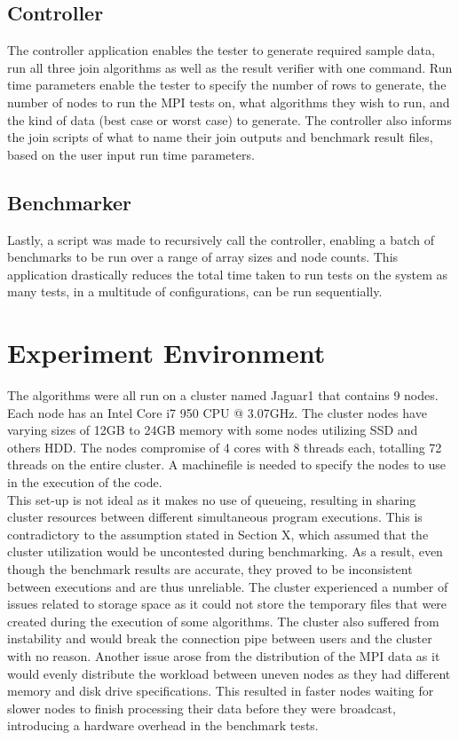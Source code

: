 \documentclass[10.5 pt, conference]{IEEEtran}
\begin{document}
\subsection{Controller}
The controller application enables the tester to generate required sample data, run all three join algorithms as well as the result verifier with one command. Run time parameters enable the tester to specify the number of rows to generate, the number of nodes to run the MPI tests on, what algorithms they wish to run, and the kind of data (best case or worst case) to generate. The controller also informs the join scripts of what to name their join outputs and benchmark result files, based on the user input run time parameters.

\subsection{Benchmarker}
Lastly, a script was made to recursively call the controller, enabling a batch of benchmarks to be run over a range of array sizes and node counts. This application drastically reduces the total time taken to run tests on the system as many tests, in a multitude of configurations, can be run sequentially. 

\section{Experiment Environment}
The algorithms were all run on a cluster named Jaguar1 that contains \num{9} nodes. Each node has an Intel Core i7 950 CPU @ 3.07GHz. The cluster nodes have varying sizes of 12GB to 24GB memory with some nodes utilizing SSD and others HDD. The nodes compromise of 4 cores with 8 threads each, totalling 72 threads on the entire cluster. A machinefile is needed to specify the nodes to use in the execution of the code.\\

This set-up is not ideal as it makes no use of queueing, resulting in sharing cluster resources between different simultaneous program executions. This is contradictory to the assumption stated in Section X, which assumed that the cluster utilization would be uncontested during benchmarking. As a result, even though the benchmark results are accurate, they proved to be inconsistent between executions and are thus unreliable. The cluster experienced a number of issues related to storage space as it could not store the temporary files that were created during the execution of some algorithms. The cluster also suffered from instability and would break the connection pipe between users and the cluster with no reason. Another issue arose from the distribution of the MPI data as it would evenly distribute the workload between uneven nodes as they had different memory and disk drive specifications.  This resulted in faster nodes waiting for slower nodes to finish processing their data before they were broadcast, introducing a hardware overhead in the benchmark tests. 
\end{document}
